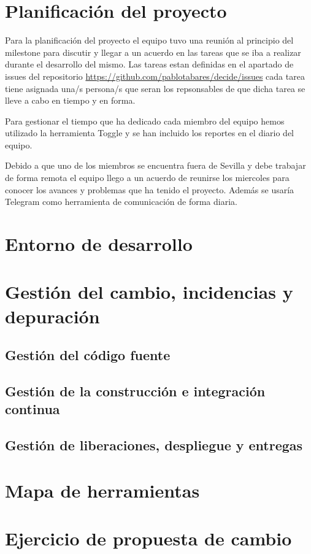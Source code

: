 \documentclass[12pt]{article}
\begin{document}
\section{Planificación del proyecto}
Para la planificación del proyecto el equipo tuvo una reunión al principio del milestone para discutir y llegar a un acuerdo en las tareas que se iba a realizar durante el desarrollo del mismo. Las tareas estan definidas en el apartado de issues del repositorio \url{https://github.com/pablotabares/decide/issues} cada tarea tiene asignada una/s persona/s que seran los repsonsables de que dicha tarea se lleve a cabo en tiempo y en forma. 

Para gestionar el tiempo que ha dedicado cada miembro del equipo hemos utilizado la herramienta Toggle \cites{toggl} y se han incluido los reportes en el diario del equipo. 

Debido a que uno de los miembros se encuentra fuera de Sevilla y debe trabajar de forma remota el equipo llego a un acuerdo de reunirse los miercoles para conocer los avances y problemas que ha tenido el proyecto. Además se usaría Telegram \cite{telegram} como herramienta de comunicación de forma diaria.

\section{Entorno de desarrollo}

\section{Gestión del cambio, incidencias y depuración}
\subsection{Gestión del código fuente}
\subsection{Gestión de la construcción e integración continua}
\subsection{Gestión de liberaciones, despliegue y entregas}

\section{Mapa de herramientas}
\section{Ejercicio de propuesta de cambio}
\end{document}
